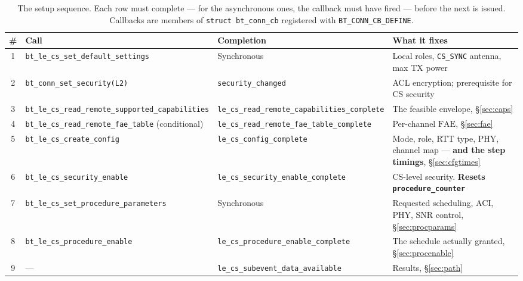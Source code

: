 \documentclass[11pt,a4paper]{article}
\newcommand{\code}[1]{\texttt{\small #1}}
\newcommand{\FAE}{\ensuremath{\mathrm{FAE}}}
\begin{document}
\begin{table}[htb]
\caption{The setup sequence. Each row must complete --- for the asynchronous ones, the callback must
have fired --- before the next is issued. Callbacks are members of \code{struct bt\_\allowbreak{}conn\_\allowbreak{}cb}
registered with \code{BT\_\allowbreak{}CONN\_\allowbreak{}CB\_\allowbreak{}DEFINE}.}
\label{tab:setup}
\centering\scriptsize
\begin{tabular}{@{}cL{44mm}L{40mm}L{44mm}@{}}
\toprule
\# & Call & Completion & What it fixes \\
 & \code{bt\_\allowbreak{}le\_\allowbreak{}cs\_\allowbreak{}set\_\allowbreak{}default\_\allowbreak{}settings} & Synchronous & Local roles, \code{CS\_\allowbreak{}SYNC} antenna, max TX power \\
2 & \code{bt\_\allowbreak{}conn\_\allowbreak{}set\_\allowbreak{}security(L2)} & \code{security\_\allowbreak{}changed} & ACL encryption; prerequisite for CS security \\
3 & \code{bt\_\allowbreak{}le\_\allowbreak{}cs\_\allowbreak{}read\_\allowbreak{}remote\_\allowbreak{}supported\_\allowbreak{}capabilities} & \code{le\_\allowbreak{}cs\_\allowbreak{}read\_\allowbreak{}remote\_\allowbreak{}capabilities\_\allowbreak{}complete} & The feasible envelope, \S\ref{sec:caps} \\
4 & \code{bt\_\allowbreak{}le\_\allowbreak{}cs\_\allowbreak{}read\_\allowbreak{}remote\_\allowbreak{}fae\_\allowbreak{}table} (conditional) & \code{le\_\allowbreak{}cs\_\allowbreak{}read\_\allowbreak{}remote\_\allowbreak{}fae\_\allowbreak{}table\_\allowbreak{}complete} & Per-channel $\FAE$, \S\ref{sec:fae} \\
5 & \code{bt\_\allowbreak{}le\_\allowbreak{}cs\_\allowbreak{}create\_\allowbreak{}config} & \code{le\_\allowbreak{}cs\_\allowbreak{}config\_\allowbreak{}complete} & Mode, role, RTT type, PHY, channel map --- \textbf{and the step timings}, \S\ref{sec:cfgtimes} \\
6 & \code{bt\_\allowbreak{}le\_\allowbreak{}cs\_\allowbreak{}security\_\allowbreak{}enable} & \code{le\_\allowbreak{}cs\_\allowbreak{}security\_\allowbreak{}enable\_\allowbreak{}complete} & CS-level security. \textbf{Resets \code{procedure\_\allowbreak{}counter}} \\
7 & \code{bt\_\allowbreak{}le\_\allowbreak{}cs\_\allowbreak{}set\_\allowbreak{}procedure\_\allowbreak{}parameters} & Synchronous & Requested scheduling, ACI, PHY, SNR control, \S\ref{sec:procparams} \\
8 & \code{bt\_\allowbreak{}le\_\allowbreak{}cs\_\allowbreak{}procedure\_\allowbreak{}enable} & \code{le\_\allowbreak{}cs\_\allowbreak{}procedure\_\allowbreak{}enable\_\allowbreak{}complete} & The schedule actually granted, \S\ref{sec:procenable} \\
9 & --- & \code{le\_\allowbreak{}cs\_\allowbreak{}subevent\_\allowbreak{}data\_\allowbreak{}available} & Results, \S\ref{sec:path} \\
\bottomrule
\end{tabular}
\end{table}
\end{document}
